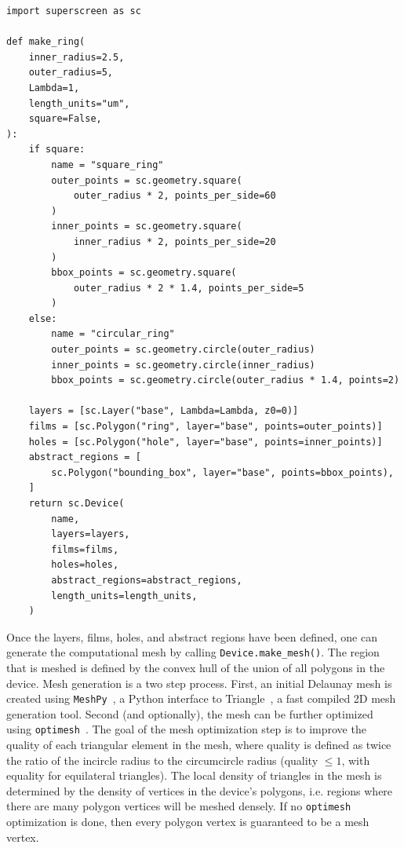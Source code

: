 \documentclass[preprint,12pt]{elsarticle}
\newenvironment{code}{\captionsetup{type=listing}}{}
\begin{document}
\begin{code}
\begin{verbatim}
import superscreen as sc

def make_ring(
    inner_radius=2.5,
    outer_radius=5,
    Lambda=1,
    length_units="um",
    square=False,
):
    if square:
        name = "square_ring"
        outer_points = sc.geometry.square(
            outer_radius * 2, points_per_side=60
        )
        inner_points = sc.geometry.square(
            inner_radius * 2, points_per_side=20
        )
        bbox_points = sc.geometry.square(
            outer_radius * 2 * 1.4, points_per_side=5
        )
    else:
        name = "circular_ring"
        outer_points = sc.geometry.circle(outer_radius)
        inner_points = sc.geometry.circle(inner_radius)
        bbox_points = sc.geometry.circle(outer_radius * 1.4, points=2)

    layers = [sc.Layer("base", Lambda=Lambda, z0=0)]
    films = [sc.Polygon("ring", layer="base", points=outer_points)]
    holes = [sc.Polygon("hole", layer="base", points=inner_points)]
    abstract_regions = [
        sc.Polygon("bounding_box", layer="base", points=bbox_points),
    ]
    return sc.Device(
        name,
        layers=layers,
        films=films,
        holes=holes,
        abstract_regions=abstract_regions,
        length_units=length_units,
    )
\end{verbatim}
\label{code:device}
\end{code}

Once the layers, films, holes, and abstract regions have been defined, one can generate the computational mesh by calling \texttt{Device.make_mesh()}. The region that is meshed is defined by the convex hull of the union of all polygons in the device. Mesh generation is a two step process. First, an initial Delaunay mesh is created using \texttt{MeshPy}~\cite{Klockner}, a Python interface to Triangle~\cite{shewchuk96b, Shewchuk}, a fast compiled 2D mesh generation tool. Second (and optionally), the mesh can be further optimized using \texttt{optimesh}~\cite{nico_schlomer_adam_dobrawy_2021}. The goal of the mesh optimization step is to improve the quality of each triangular element in the mesh, where quality is defined as twice the ratio of the incircle radius to the circumcircle radius (quality $\leq1$, with equality for equilateral triangles). The local density of triangles in the mesh is determined by the density of vertices in the device's polygons, i.e. regions where there are many polygon vertices will be meshed densely. If no \texttt{optimesh} optimization is done, then every polygon vertex is guaranteed to be a mesh vertex.
\end{document}
